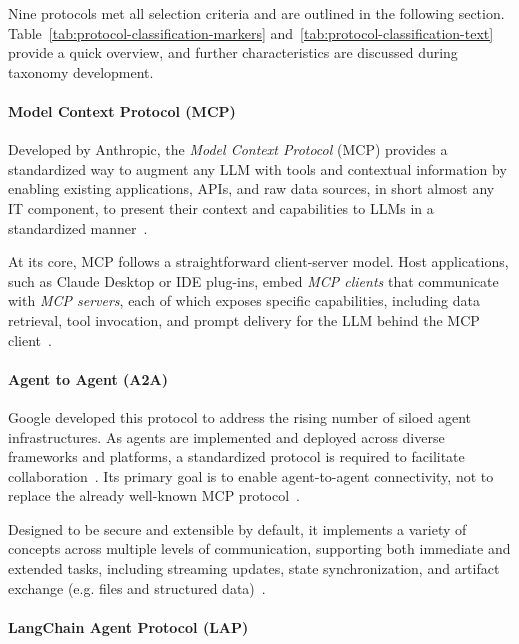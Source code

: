 \documentclass[pdflatex,sn-mathphys-num]{sn-jnl}%
\theoremstyle{thmstyleone}%
\theoremstyle{thmstyletwo}%
\theoremstyle{thmstylethree}%
\begin{document}
Nine protocols met all selection criteria and are outlined in the following section. Table~\ref{tab:protocol-classification-markers} and~\ref{tab:protocol-classification-text} provide a quick overview, and further characteristics are discussed during taxonomy development.

\paragraph{Model Context Protocol (MCP)}

Developed by Anthropic, the \textit{Model Context Protocol} (MCP) provides a standardized way to augment any LLM with tools and contextual information by enabling existing applications, APIs, and raw data sources, in short almost any IT component, to present their context and capabilities to LLMs in a standardized manner~\cite{mcpgit,mcpdocscorearchitecture}.

At its core, MCP follows a straightforward client-server model. Host applications, such as Claude Desktop or IDE plug-ins, embed \textit{MCP clients} that communicate with \textit{MCP servers}, each of which exposes specific capabilities, including data retrieval, tool invocation, and prompt delivery for the LLM behind the MCP client~\cite{mcpdocscorearchitecture}.

\paragraph{Agent to Agent (A2A)}

Google developed this protocol to address the rising number of siloed agent infrastructures. As agents are implemented and deployed across diverse frameworks and platforms, a standardized protocol is required to facilitate collaboration~\cite{a2adocskeyconcepts}. Its primary goal is to enable agent-to-agent connectivity, not to replace the already well-known MCP protocol~\cite{a2adocsmcp}.

Designed to be secure and extensible by default, it implements a variety of concepts across multiple levels of communication, supporting both immediate and extended tasks, including streaming updates, state synchronization, and artifact exchange (e.g. files and structured data)~\cite{a2agit,a2adocsspecification}. 

\paragraph{LangChain Agent Protocol (LAP)}
\end{document}
